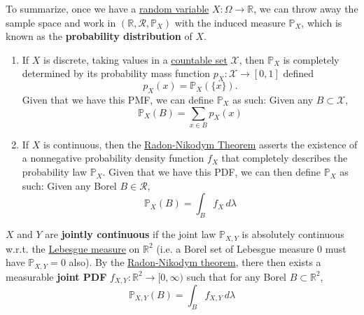   To summarize, once we have a \hyperref[def:random-variable]{random variable} $X: \Omega \rightarrow \mathbb{R}$, we can throw away the sample space and work in $(\mathbb{R}, \mathcal{R}, \mathbb{P}_X)$ with the induced measure $\mathbb{P}_X$, which is known as the \textbf{probability distribution} of $X$.  
  \begin{enumerate}
    \item If $X$ is discrete, taking values in a \hyperref[st-def:countable]{countable set} $\mathcal{X}$, then $\mathbb{P}_X$ is completely determined by its probability mass function $p_X : \mathcal{X} \rightarrow [0, 1]$ defined 
    \begin{equation}
      p_X (x) = \mathbb{P}_X (\{x\}).
    \end{equation}
    Given that we have this PMF, we can define $\mathbb{P}_X$ as such: Given any $B \subset \mathcal{X}$, 
    \begin{equation}
      \mathbb{P}_X (B) = \sum_{x \in B} p_X (x)
    \end{equation}
    \item If $X$ is continuous, then the \hyperref[mt-thm:rn-der]{Radon-Nikodym Theorem} asserts the existence of a nonnegative probability density function $f_X$ that completely describes the probability law $\mathbb{P}_X$. Given that we have this PDF, we can then define $\mathbb{P}_X$ as such: Given any Borel $B \in \mathcal{R}$, 
    \begin{equation}
      \mathbb{P}_X (B) = \int_B f_X \, d\lambda
    \end{equation}
  \end{enumerate}

	\begin{definition}
	  \label{def:joint-continuous-random-variable}
		$X$ and $Y$ are \textbf{jointly continuous} if the joint law $\mathbb{P}_{X, Y}$ is absolutely continuous w.r.t. the \hyperref[mt-def:lebesgue-measure]{Lebesgue measure} on $\mathbb{R}^2$ (i.e. a Borel set of Lebesgue measure $0$ must have $\mathbb{P}_{X, Y} = 0$ also). By the \hyperref[mt-thm:rn-der]{Radon-Nikodym theorem}, there then exists a measurable \textbf{joint PDF} $f_{X, Y} : \mathbb{R}^2 \to [0, \infty)$ such that for any Borel $B \subset \mathbb{R}^2$, 
		\begin{equation}
			\mathbb{P}_{X, Y} (B) = \int_B f_{X, Y} \, d\lambda
		\end{equation}
	\end{definition}

